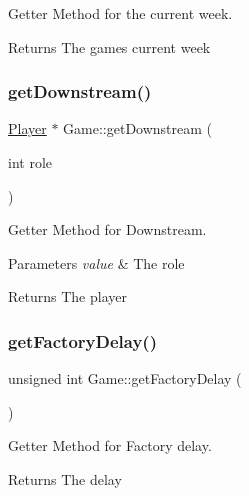 Getter Method for the current week. 

\begin{DoxyReturn}{Returns}
The games current week 
\end{DoxyReturn}
\mbox{\label{classGame_afd99959acb65696ddab45bdedf7b17fb}} 
\subsubsection{\texorpdfstring{get\+Downstream()}{getDownstream()}}
{\footnotesize\ttfamily \hyperlink{classPlayer}{Player} $\ast$ Game\+::get\+Downstream (\begin{DoxyParamCaption}\item[{int}]{role }\end{DoxyParamCaption})}



Getter Method for Downstream. 


\begin{DoxyParams}{Parameters}
{\em value} & The role \\
\hline
\end{DoxyParams}
\begin{DoxyReturn}{Returns}
The player 
\end{DoxyReturn}
\mbox{\label{classGame_a924b77b7e4e073da9fd634e5200c8358}} 
\subsubsection{\texorpdfstring{get\+Factory\+Delay()}{getFactoryDelay()}}
{\footnotesize\ttfamily unsigned int Game\+::get\+Factory\+Delay (\begin{DoxyParamCaption}{ }\end{DoxyParamCaption})}



Getter Method for Factory delay. 

\begin{DoxyReturn}{Returns}
The delay 
\end{DoxyReturn}
\mbox{\label{classGame_aa4a7ec996cff81f9b7b6e90103ff2a1a}} 
